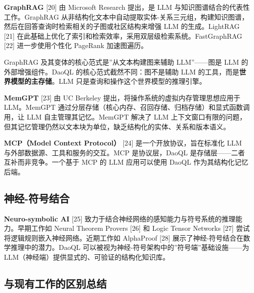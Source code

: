 \documentclass[11pt,a4paper]{ctexart}
\begin{document}
\textbf{GraphRAG} {[}20{]} 由 Microsoft Research 提出，是 LLM
与知识图谱结合的代表性工作。GraphRAG
从非结构化文本中自动提取实体-关系三元组，构建知识图谱，然后在回答查询时检索相关的子图或社区结构来增强
LLM 的生成。LightRAG {[}21{]}
在此基础上优化了索引和检索效率，采用双层级检索系统。FastGraphRAG
{[}22{]} 进一步使用个性化 PageRank 加速图遍历。

GraphRAG 及其变体的核心范式是''从文本构建图来辅助 LLM''------图是 LLM
的外部增强组件。DaoQL 的核心范式截然不同：图不是辅助 LLM
的工具，而是\textbf{世界模型的主存储}。LLM
只是查询和操作这个世界模型的推理引擎。

\textbf{MemGPT} {[}23{]} 由 UC Berkeley
提出，将操作系统的虚拟内存管理思想应用于 LLM。MemGPT
通过分层存储（核心内存、召回存储、归档存储）和显式函数调用，让 LLM
自主管理其记忆。MemGPT 解决了 LLM
上下文窗口有限的问题，但其记忆管理仍然以文本块为单位，缺乏结构化的实体、关系和版本语义。

\textbf{MCP（Model Context Protocol）} {[}24{]}
是一个开放协议，旨在标准化 LLM 与外部数据源、工具和服务的交互。MCP
是协议层，DaoQL 是存储层------二者互补而非竞争。一个基于 MCP 的 LLM
应用可以使用 DaoQL 作为其结构化记忆后端。

\subsection{神经-符号结合}\label{ux795eux7ecf-ux7b26ux53f7ux7ed3ux5408}

\textbf{Neuro-symbolic AI} {[}25{]}
致力于结合神经网络的感知能力与符号系统的推理能力。早期工作如 Neural
Theorem Provers {[}26{]} 和 Logic Tensor Networks {[}27{]}
尝试将逻辑规则嵌入神经网络。近期工作如 AlphaProof {[}28{]}
展示了神经-符号结合在数学推理中的潜力。DaoQL
可以被视为神经-符号架构中的''符号端''基础设施------为
LLM（神经端）提供显式的、可验证的结构化知识库。

\subsection{与现有工作的区别总结}\label{ux4e0eux73b0ux6709ux5de5ux4f5cux7684ux533aux522bux603bux7ed3}
\end{document}
